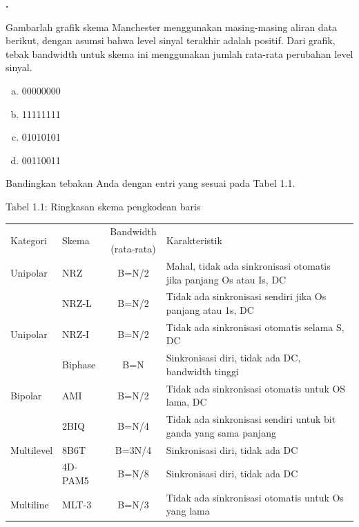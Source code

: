 \documentclass[oneside]{book}
\newcommand{\exercisename}{Latihan}
\newcounter{exer}[chapter]
\renewcommand{\theexer}{\thechapter.\arabic{exer}}
\newenvironment{exercise}[1][]{
  \refstepcounter{exer}
  \par\noindent\textbf{\color{main}{\exercisename} \theexer #1 }\rmfamily}{
  \par\ignorespacesafterend}
\begin{document}
\begin{exercise}

  Gambarlah grafik skema Manchester menggunakan masing-masing aliran data berikut, dengan asumsi bahwa level sinyal terakhir adalah positif. Dari grafik, tebak bandwidth untuk skema ini menggunakan jumlah rata-rata perubahan level sinyal.
  \begin{enumerate}[a)]
    \item 00000000
    \item 11111111
    \item 01010101
    \item 00110011
  \end{enumerate}

  Bandingkan tebakan Anda dengan entri yang sesuai pada Tabel 1.1.

  \begin{table}[htbp]
    \begin{center}
      \centerline{Tabel 1.1: Ringkasan skema pengkodean baris}
      \begin{tabular}{|l|l|c|p{6cm}|}
        \cline{1-4}
        \multirow{2}{*}{Kategori}&\multirow{2}{*}{Skema}&\multicolumn{1}{c|}{Bandwidth}&\multirow{2}{*}{\centerline{Karakteristik}} \\
        & &\multicolumn{1}{c|}{(rata-rata)}& \\
        \cline{1-4}
        Unipolar&NRZ&B=N/2&Mahal, tidak ada sinkronisasi otomatis jika panjang Os atau Is, DC \\
        \cline{1-4}
        \multirow{3}{*}{Unipolar}&NRZ-L&B=N/2&Tidak ada sinkronisasi sendiri jika Os panjang atau 1s, DC \\
        \cline{2-4}
        &NRZ-I&B=N/2&Tidak ada sinkronisasi otomatis selama S, DC \\
        \cline{2-4}
        &Biphase&B=N&Sinkronisasi diri, tidak ada DC, bandwidth tinggi \\
        \cline{1-4}
        Bipolar&AMI&B=N/2&Tidak ada sinkronisasi otomatis untuk OS lama, DC \\
        \cline{1-4}
        \multirow{3}{*}{Multilevel}&2BIQ&B=N/4&Tidak ada sinkronisasi sendiri untuk bit ganda yang sama panjang \\
        \cline{2-4}
        &8B6T&B=3N/4&Sinkronisasi diri, tidak ada DC \\
        \cline{2-4}
        &4D-PAM5&B=N/8&Sinkronisasi diri, tidak ada DC \\
        \cline{1-4}
        Multiline&MLT-3&B=N/3&Tidak ada sinkronisasi otomatis untuk Os yang lama \\
        \cline{1-4}
      \end{tabular}
    \end{center}\vspace*{6px}
  \end{table}\vspace*{8px}

\end{exercise}
\end{document}
